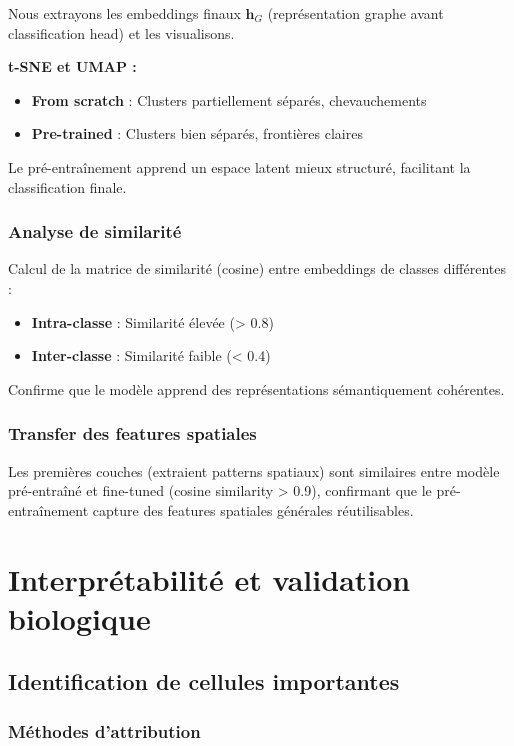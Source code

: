 Nous extrayons les embeddings finaux $\mathbf{h}_G$ (représentation graphe avant classification head) et les visualisons.

\textbf{t-SNE et UMAP :}
\begin{itemize}
    \item \textbf{From scratch} : Clusters partiellement séparés, chevauchements
    \item \textbf{Pre-trained} : Clusters bien séparés, frontières claires
\end{itemize}

Le pré-entraînement apprend un espace latent mieux structuré, facilitant la classification finale.

\subsubsection{Analyse de similarité}

Calcul de la matrice de similarité (cosine) entre embeddings de classes différentes :
\begin{itemize}
    \item \textbf{Intra-classe} : Similarité élevée (> 0.8)
    \item \textbf{Inter-classe} : Similarité faible (< 0.4)
\end{itemize}

Confirme que le modèle apprend des représentations sémantiquement cohérentes.

\subsubsection{Transfer des features spatiales}

Les premières couches (extraient patterns spatiaux) sont similaires entre modèle pré-entraîné et fine-tuned (cosine similarity > 0.9), confirmant que le pré-entraînement capture des features spatiales générales réutilisables.

\section{Interprétabilité et validation biologique}

\subsection{Identification de cellules importantes}

\subsubsection{Méthodes d'attribution}

